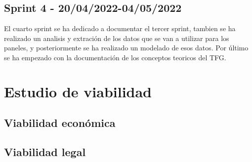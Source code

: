 \subsection{Sprint 4 - 20/04/2022-04/05/2022}
El cuarto sprint se ha dedicado a documentar el tercer sprint, tambien se ha realizado un analisis y extración de los datos que se van a utilizar para los paneles, y posteriormente se ha realizado un modelado de esos datos. Por último se ha empezado con la documentación de los conceptos teoricos del TFG.
\section{Estudio de viabilidad}



\subsection{Viabilidad económica}

\subsection{Viabilidad legal}


